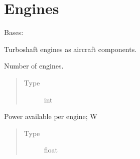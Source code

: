 \documentclass[letterpaper,10pt,english]{sphinxmanual}
\begin{document}
\section{Engines}
\label{\detokenize{modules/engines:module-engines}}\label{\detokenize{modules/engines:engines}}\label{\detokenize{modules/engines::doc}}

\begin{fulllineitems}
\label{\detokenize{modules/engines:engines.Engines}}
\sphinxAtStartPar
Bases: 

\sphinxAtStartPar
Turboshaft engines as aircraft components.

\begin{fulllineitems}
\label{\detokenize{modules/engines:engines.Engines.number_of_engines}}
\sphinxAtStartPar
Number of engines.
\begin{quote}\begin{description}
\item[{Type}] \leavevmode
\sphinxAtStartPar
int

\end{description}\end{quote}

\end{fulllineitems}


\begin{fulllineitems}
\label{\detokenize{modules/engines:engines.Engines.power_available}}
\sphinxAtStartPar
Power available per engine; W
\begin{quote}\begin{description}
\item[{Type}] \leavevmode
\sphinxAtStartPar
float


\end{description}
\end{quote}
\end{fulllineitems}
\end{fulllineitems}
\end{document}
